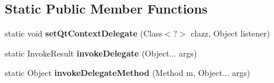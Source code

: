 \subsection*{Static Public Member Functions}
\begin{DoxyCompactItemize}
\item 
\mbox{\label{classorg_1_1qtproject_1_1qt5_1_1android_1_1bindings_1_1_qt_application_ae25d0f6b43f7521615f05aac587a2292}} 
static void {\bfseries set\+Qt\+Context\+Delegate} (Class$<$?$>$ clazz, Object listener)
\item 
\mbox{\label{classorg_1_1qtproject_1_1qt5_1_1android_1_1bindings_1_1_qt_application_aaea224774bc271c3ffb9dc825aef77fc}} 
static Invoke\+Result {\bfseries invoke\+Delegate} (Object... args)
\item 
\mbox{\label{classorg_1_1qtproject_1_1qt5_1_1android_1_1bindings_1_1_qt_application_aa504dd542fde6a2a5b417cd393a91733}} 
static Object {\bfseries invoke\+Delegate\+Method} (Method m, Object... args)
\end{DoxyCompactItemize}
